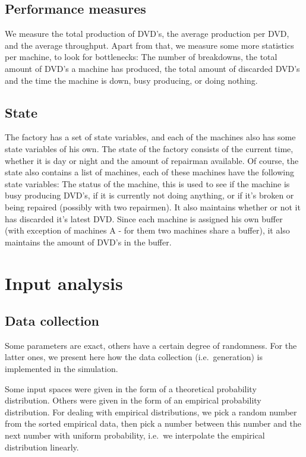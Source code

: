 \documentclass{article}
\begin{document}
\subsection{Performance measures}
\label{performance_measures}
We measure the total production of DVD's, the average production per DVD,
and the average throughput.
Apart from that, we measure some more statistics per machine, to look for bottlenecks:
The number of breakdowns, the total amount of DVD's a machine has produced,
the total amount of discarded DVD's and the time the machine is down,
busy producing, or doing nothing.

\subsection{State}
The factory has a set of state variables, and each of the machines also has some state variables of his own.
The state of the factory consists of the current time, whether it is day or night and the amount of repairman available.
Of course, the state also contains a list of machines, each of these machines have the following state variables:
The status of the machine, this is used to see if the machine is busy producing DVD's, if it is currently not doing anything, or if it's broken or being repaired (possibly with two repairmen).
It also maintains whether or not it has discarded it's latest DVD\@.
Since each machine is assigned his own buffer (with exception of machines A - for them two machines share a buffer), it also maintains the amount of DVD's in the buffer.


\section{Input analysis}

\subsection{Data collection}
Some parameters are exact, others have a certain degree of randomness.
For the latter ones, we present here how the data collection (i.e.\ generation) is implemented in the simulation.

Some input spaces were given in the form of a theoretical probability distribution.
Others were given in the form of an empirical probability distribution.
For dealing with empirical distributions, we pick a random number from the sorted empirical data, then pick a number between this number and the next number with uniform probability, i.e.\ we interpolate the empirical distribution linearly.
\end{document}
